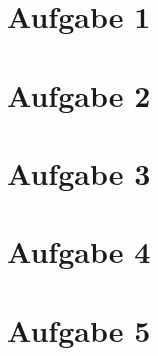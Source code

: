 \newcommand{\examdate}{16.02.2021}
\newcommand{\lecturer}{Andre Wachsmuth}
\newcommand{\modulecode}{3MI-MATHE-10}
\newcommand{\module}{Algebra/Analysis}
\newcommand{\submodule}{Analysis}
\newcommand{\termnumber}{1}
\newcommand{\allottedtime}{40 min}
\newcommand{\permittedtools}{1 handbeschriebenes A4-Blatt}
\newcommand{\scoretable}{
	\begin{tabularx}{\textwidth}{l|Y|Y|Y|Y|Y|Y}
		Aufgabe        & 1 & 2 & 3 & 4  & 5 & Summe \\ [1ex] \hline
		Soll-Punktzahl & 9 & 8 & 8 & 8  & 8 &       \\ [3ex]
		Ist-Punktzahl  &   &   &   &    &   &      ¸\\ [3ex]
	\end{tabularx}
}







\newpage

\section* {Aufgabe 1}



\newpage

\section* {Aufgabe 2}



\newpage

\section* {Aufgabe 3}



\newpage

\section* {Aufgabe 4}



\newpage

\section* {Aufgabe 5}

